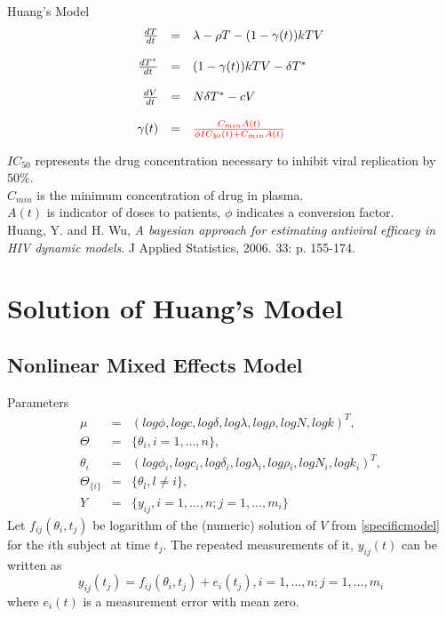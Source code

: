 \documentclass[9pt]{beamer}
\begin{document}
\begin{frame}{Huang's Model}
\begin{equation}
\begin{array}{rcl}
\frac{dT}{dt} & = & \lambda{}-\rho{}T-(1-\gamma{}(t))kTV \\ \\
\frac{dT^{*}}{dt} & = & (1-\gamma{}(t))kTV-\delta{}T^{*} \\ \\
\frac{dV}{dt} & = & N\delta{}T^{*}-cV  \label{Huangmodel} \\ \\
\gamma{}(t) & = & {\color{red}\frac{C_{min}A(t)}{\phi{}IC_{50}(t)+C_{min}A(t)}}
\end{array}
\end{equation}

$IC_{50}$ represents the drug concentration necessary to inhibit viral replication by $50\%$. \\
$C_{min}$ is the minimum concentration of drug in plasma. \\
$A(t)$ is indicator of doses to patients, $\phi$ indicates a conversion factor. \\
Huang, Y. and H. Wu, 
\emph{A bayesian approach for estimating antiviral efficacy in HIV dynamic models}. 
J Applied Statistics, 2006. 33: p. 155-174.
\end{frame}

\section[Solution of Huang's Model]{Solution of Huang's Model}
\subsection{Nonlinear Mixed Effects Model}
\begin{frame}{Parameters}
\begin{equation}
\begin{array}{rcl}
\mu & = & (log\phi{},logc,log\delta{},log\lambda{},log\rho{},logN,logk)^{T}, \\
\Theta & = & \{\theta_{i},i=1,\ldots,n\}, \\
\theta_{i} & = & (log\phi{}_{i},logc_{i},log\delta{}_{i},log\lambda{}_{i},log\rho{}_{i},logN_{i},logk_{i})^{T}, \\
\Theta_{\{i\}} & = & \{\theta_{l},l\neq{}i\}, \\
Y & = & \{y_{ij},i=1,\ldots,n;j=1,\ldots,m_{i}\}
\end{array}
\end{equation}
Let $f_{ij}(\theta_{i},t_{j})$ be logarithm of the (numeric) solution of $V$ from \eqref{specificmodel} for the $i$th subject at time $t_j$. The repeated measurements of it, $y_{ij}(t)$ can be written as
\begin{equation}
y_{ij}(t_{j})=f_{ij}(\theta_{i},t_{j})+e_{i}(t_{j}), i=1,\ldots,n;j=1,\ldots,m_{i}
\end{equation}
where $e_{i}(t)$ is a measurement error with mean zero. 
\end{frame}
\end{document}
